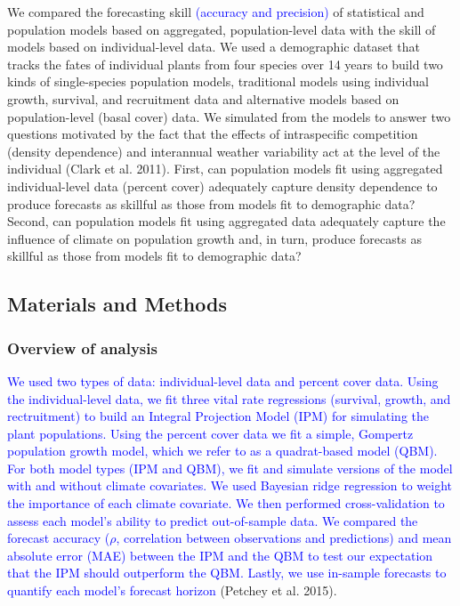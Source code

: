 \documentclass[12pt,]{article}
\begin{document}
We compared the forecasting skill
\textcolor{blue}{(accuracy and precision)} of statistical and population
models based on aggregated, population-level data with the skill of
models based on individual-level data. We used a demographic dataset
that tracks the fates of individual plants from four species over 14
years to build two kinds of single-species population models,
traditional models using individual growth, survival, and recruitment
data and alternative models based on population-level (basal cover)
data. We simulated from the models to answer two questions motivated by
the fact that the effects of intraspecific competition (density
dependence) and interannual weather variability act at the level of the
individual (Clark et al. 2011). First, can population models fit using
aggregated individual-level data (percent cover) adequately capture
density dependence to produce forecasts as skillful as those from models
fit to demographic data? Second, can population models fit using
aggregated data adequately capture the influence of climate on
population growth and, in turn, produce forecasts as skillful as those
from models fit to demographic data?

\subsection{Materials and Methods}\label{materials-and-methods}

\subsubsection{Overview of analysis}\label{overview-of-analysis}

\textcolor{blue}{We used two types of data: individual-level data and percent cover data.
Using the individual-level data, we fit three vital rate regressions (survival, growth, and rectruitment) to build an Integral Projection Model (IPM) for simulating the plant populations. Using the percent cover data we fit a simple, Gompertz population growth model, which we refer to as a quadrat-based model (QBM).
For both model types (IPM and QBM), we fit and simulate versions of the model with and without climate covariates.
We used Bayesian ridge regression to weight the importance of each climate covariate.
We then performed cross-validation to assess each model's ability to predict out-of-sample data. We compared the forecast accuracy ($\rho$, correlation between observations and predictions) and mean absolute error (MAE) between the IPM and the QBM to test our expectation that the IPM should outperform the QBM.
Lastly, we use in-sample forecasts to quantify each model's forecast horizon}
(Petchey et al. 2015).
\end{document}
